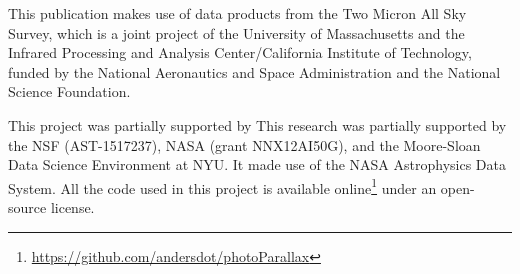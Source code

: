 \documentclass[modern]{aastex61}
\newcommand{\acronym}[1]{{\small{#1}}}
\begin{document}
This publication makes use of data products from the Two Micron All
Sky Survey, which is a joint project of the
University of Massachusetts and the Infrared Processing and Analysis
Center/California Institute of Technology, funded by the National
Aeronautics and Space Administration and the National Science
Foundation.

This project was partially supported by This research was partially supported by
  the \acronym{NSF} (\acronym{AST-1517237}),
  \acronym{NASA} (grant \acronym{NNX12AI50G}),
  and the Moore-Sloan Data Science Environment at \acronym{NYU}.
It made use of the \acronym{NASA} Astrophysics Data System.
All the code used in this project is available online\footnote{\url{https://github.com/andersdot/photoParallax}} under an open-source license.




\clearpage
\end{document}
